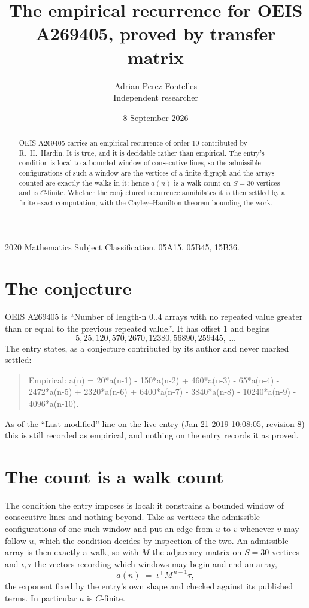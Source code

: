 \documentclass[11pt,a4paper]{article}
\title{The empirical recurrence for OEIS A269405, proved by transfer matrix}
\author{Adrian Perez Fontelles\\ \small Independent researcher}
\date{8 September 2026}
\theoremstyle{plain}
\theoremstyle{definition}
\begin{document}
\maketitle

\begin{abstract}
OEIS A269405 carries an empirical recurrence of order $10$ contributed by R.~H.~Hardin. It is
true, and it is decidable rather than empirical. The entry's condition is local to a bounded window of consecutive lines, so
the admissible configurations of such a window are the vertices of a finite digraph and the
arrays counted are exactly the walks in it; hence $a(n)$ is a walk count on $S=30$ vertices
and is $C$-finite. Whether the conjectured recurrence annihilates it is then settled by a
finite exact computation, with the Cayley--Hamilton theorem bounding the work.
\end{abstract}

\noindent\small 2020 Mathematics Subject Classification. 05A15, 05B45, 15B36.\normalsize

\section{The conjecture}

OEIS A269405 is ``Number of length-n 0..4 arrays with no repeated value greater than or equal to the previous repeated value.''. It has offset $1$ and begins
\[
5, 25, 120, 570, 2670, 12380, 56890, 259445,\ \dots
\]
The entry states, as a conjecture contributed by its author and never marked settled:
\begin{quote}
Empirical: a(n) = 20*a(n-1) - 150*a(n-2) + 460*a(n-3) - 65*a(n-4) - 2472*a(n-5) + 2320*a(n-6) + 6400*a(n-7) - 3840*a(n-8) - 10240*a(n-9) - 4096*a(n-10).
\end{quote}
As of the ``Last modified'' line on the live entry (Jan 21 2019 10:08:05, revision 8) this is still
recorded as empirical, and nothing on the entry records it as proved.

\section{The count is a walk count}

The condition the entry imposes is local: it constrains a bounded window of consecutive lines and nothing beyond. Take as
vertices the admissible configurations of one such window and put an edge from $u$ to $v$
whenever $v$ may follow $u$, which the condition decides by inspection of the two. An
admissible array is then exactly a walk, so with $M$ the adjacency matrix on $S=30$ vertices
and $\iota,\tau$ the vectors recording which windows may begin and end an array,
\[
a(n)\;=\;\iota^{\!\top}M^{\,n-1}\tau ,
\]
the exponent fixed by the entry's own shape and checked against its published terms. In
particular $a$ is $C$-finite.
\end{document}
